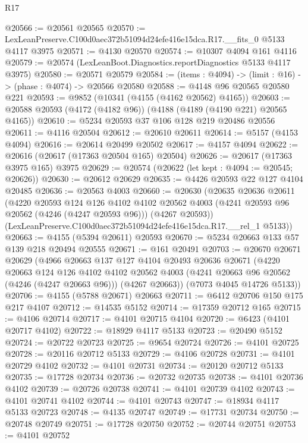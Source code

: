 \begin{lexlean}{R17}
\begin{coremodule}
@20566 := @20561 @20565
@20570 := LexLeanPreserve.C100d0aec372b51094d24efe416e15dca.R17.__fits_0 @5133 @4117 @3975
@20571 := @4130 @20570
@20574 := @10307 @4094 @161 @4116
@20579 := @20574 (LexLeanBoot.Diagnostics.reportDiagnostics @5133 @4117 @3975)
@20580 := @20571 @20579
@20584 := (items : @4094) -> (limit : @16) -> (phase : @4074) -> @20566 @20580
@20588 := @4148 @96 @20565 @20580 @221
@20593 := @9852 (@10341 (@4155 (@4162 @20562) @4165))
@20603 := @20588 @20593 (@4172 (@4182 @96)) (@4188 (@4189 (@4190 @221) @20565 @4165))
@20610 := @5234 @20593 @37 @106 @128 @219 @20486 @20556
@20611 := @4116 @20504
@20612 := @20610 @20611
@20614 := @5157 (@4153 @4094)
@20616 := @20614 @20499 @20502
@20617 := @4157 @4094
@20622 := @20616 (@20617 (@17363 @20504 @165) @20504)
@20626 := @20617 (@17363 @3975 @165) @3975
@20629 := @20574 (@20622 (let kept : @4094 := @20545; @20626))
@20630 := @20612 @20629
@20635 := @4426 @20593 @22 @127 @4104 @20485
@20636 := @20563 @4003
@20660 := @20630
    (@20635
      @20636
      @20611
      (@4220
        @20593
        @124
        @126
        @4102
        @4102
        @20562
        @4003
        (@4241 @20593 @96 @20562 (@4246 (@4247 @20593 @96)))
        (@4267 @20593))
      (LexLeanPreserve.C100d0aec372b51094d24efe416e15dca.R17.__rel_1 @5133))
@20663 := @4155 (@5394 @20611) @20593
@20670 := @5234 @20663 @133 @57 @139 @218 @20494 @20555
@20671 := @161 @20491
@20703 := @20670
    @20671
    @20629
    (@4966
      @20663
      @137
      @127
      @4104
      @20493
      @20636
      @20671
      (@4220
        @20663
        @124
        @126
        @4102
        @4102
        @20562
        @4003
        (@4241 @20663 @96 @20562 (@4246 (@4247 @20663 @96)))
        (@4267 @20663))
      (@7073 @4045 @14726 @5133))
@20706 := @4155 (@5788 @20671) @20663
@20711 := @6412 @20706 @150 @175 @217 @4107
@20712 := @14535 @5152
@20714 := @17359 @20712 @165
@20715 := @4106 @20714
@20717 := @4101 @20715 @4104
@20720 := @6423 (@4101 @20717 @4102)
@20722 := @18929 @4117 @5133
@20723 := @20490 @5152
@20724 := @20722 @20723
@20725 := @9654 @20724
@20726 := @4101 @20725
@20728 := @20116 @20712 @5133
@20729 := @4106 @20728
@20731 := @4101 @20729 @4102
@20732 := @4101 @20731
@20734 := @20120 @20712 @5133
@20735 := @17728 @20734
@20736 := @20732 @20735
@20738 := @4101 @20736 @4102
@20739 := @20726 @20738
@20741 := @4101 @20739 @4102
@20743 := @4101 @20741 @4102
@20744 := @4101 @20743
@20747 := @18934 @4117 @5133 @20723
@20748 := @4135 @20747
@20749 := @17731 @20734
@20750 := @20748 @20749
@20751 := @17728 @20750
@20752 := @20744 @20751
@20753 := @4101 @20752

\end{coremodule}
\end{lexlean}
